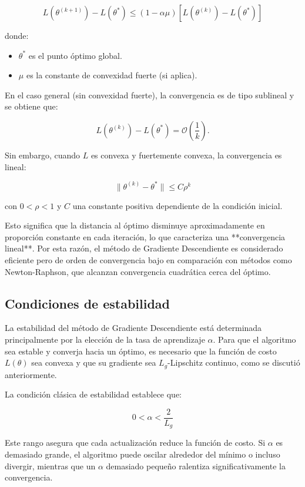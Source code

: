\documentclass[12pt, letterpaper,conference]{IEEEtran}
\begin{document}
\[
L(\theta^{(k+1)}) - L(\theta^*) \leq (1 - \alpha \mu) [L(\theta^{(k)}) - L(\theta^*)]
\]

donde:
\begin{itemize}
    \item \( \theta^* \) es el punto óptimo global.
    \item \( \mu \) es la constante de convexidad fuerte (si aplica).
\end{itemize}

En el caso general (sin convexidad fuerte), la convergencia es de tipo sublineal y se obtiene que:

\[
L(\theta^{(k)}) - L(\theta^*) = \mathcal{O}\left( \frac{1}{k} \right).
\]

Sin embargo, cuando \( L \) es convexa y fuertemente convexa, la convergencia es lineal:

\[
\| \theta^{(k)} - \theta^* \| \leq C \rho^k
\]

con \( 0 < \rho < 1 \) y \( C \) una constante positiva dependiente de la condición inicial.

Esto significa que la distancia al óptimo disminuye aproximadamente en proporción constante en cada iteración, lo que caracteriza una **convergencia lineal**. Por esta razón, el método de Gradiente Descendiente es considerado eficiente pero de orden de convergencia bajo en comparación con métodos como Newton-Raphson, que alcanzan convergencia cuadrática cerca del óptimo.


\vspace{0.25cm}

\subsection{Condiciones de estabilidad}

La estabilidad del método de Gradiente Descendiente está determinada principalmente por la elección de la tasa de aprendizaje \( \alpha \). Para que el algoritmo sea estable y converja hacia un óptimo, es necesario que la función de costo \( L(\theta) \) sea convexa y que su gradiente sea \( L_g \)-Lipschitz continuo, como se discutió anteriormente.

La condición clásica de estabilidad establece que:

\[
0 < \alpha < \frac{2}{L_g}
\]

Este rango asegura que cada actualización reduce la función de costo. Si \( \alpha \) es demasiado grande, el algoritmo puede oscilar alrededor del mínimo o incluso divergir, mientras que un \( \alpha \) demasiado pequeño ralentiza significativamente la convergencia.
\end{document}
